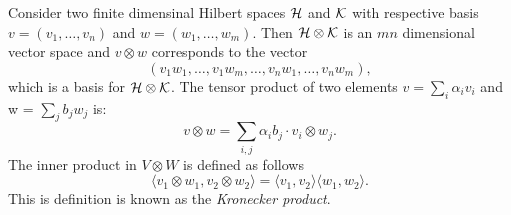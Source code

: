 \begin{definition} \label{def:tensor_prod_fin_hilb}
Consider two finite dimensinal Hilbert spaces $\mathcal{H}$ and $\mathcal{K}$ with respective basis $v=(v_1, \ldots , v_n)$ and $w=(w_1, \ldots , w_m)$.  Then $\mathcal{H} \otimes \mathcal{K}$  is an $mn$ dimensional vector space and $v \otimes w$ corresponds to the vector
\[
(v_1 w_1, \ldots, v_1 w_m, \ldots, v_n w_1, \ldots, v_n w_m),
\]
which is a basis for  $\mathcal{H} \otimes \mathcal{K}$.  The tensor product of two elements $v = \sum_i \alpha_i v_i$ and w = $\sum_j b_j  w_j$ is:
\begin{equation*}
  v \otimes w = \sum_{i,j} \alpha_i b_j \cdot v_i \otimes w_j.
\end{equation*}
 The inner product in $V \otimes W$ is defined as follows 
\begin{equation*}
  \langle v_1 \otimes w_1, v_2 \otimes w_2 \rangle = \langle v_1, v_2 \rangle \langle w_1, w_2 \rangle.
\end{equation*}
This is definition is known as the \emph{Kronecker product}.
\end{definition}

